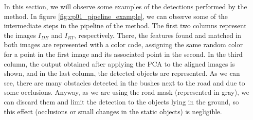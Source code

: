 In this section, we will observe some examples of the detections performed by the method. In figure \ref{fig:cp01_pipeline_example}, we can observe some of the intermediate steps in the pipeline of the method. The first two columns represent the images $I_{DB}$ and $I_{RT}$, respectively. There, the features found and matched in both images are represented with a color code, assigning the same random color for a point in the first image and its associated point in the second. In the third column, the output obtained after applying the \ac{PCA} to the aligned images is shown, and in the last column, the detected objects are represented. As we can see, there are many obstacles detected in the bushes next to the road and due to some occlusions. Anyway, as we are using the road mask (represented in gray), we can discard them and limit the detection to the objects lying in the ground, so this effect (occlusions or small changes in the static objects) is negligible.

